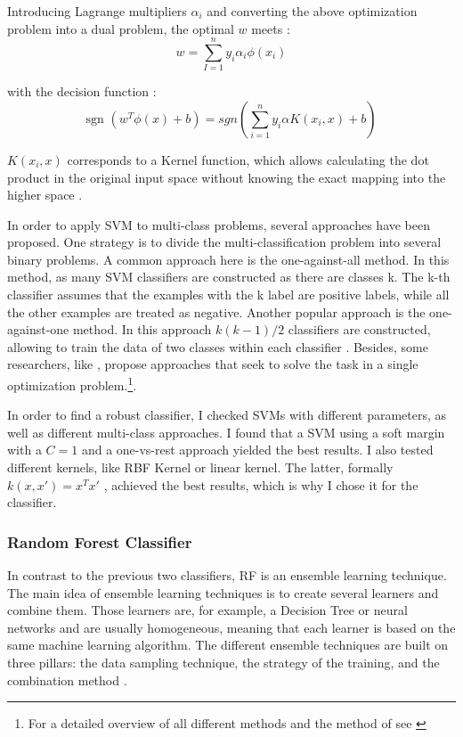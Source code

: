 \documentclass[12pt, a4paper, titlepage]{article}
\begin{document}
Introducing Lagrange multipliers $\alpha_i$ and converting the above optimization problem into a dual problem, the optimal $w$ meets \citep{Chang2001, Jordan2006}:
\[w = \sum_{I=1}^n y_i\alpha_i\phi(x_i)\]

with the decision function \citep{Chang2001}:
\[\text{sgn } (w^T\phi(x)+b) = sgn(\sum_{i=1}^n y_i \alpha K(x_i, x) +b)\]

$K(x_i, x)$ corresponds to a Kernel function, which allows calculating the dot product in the original input space without knowing the exact mapping into the higher space \citep{Han2012, Jordan2006}. 

In order to apply \ac{SVM} to multi-class problems, several approaches have been proposed. One strategy is to divide the multi-classification problem into several binary problems. A common approach here is the one-against-all method. In this method, as many \ac{SVM} classifiers are constructed as there are classes k. The k-th classifier assumes that the examples with the k label are positive labels, while all the other examples are treated as negative. Another popular approach is the one-against-one method. In this approach $k(k-1)/2$ classifiers are constructed, allowing to train the data of two classes within each classifier \citep{Hsu2002}. Besides, some researchers, like \citet{Crammer2001}, propose approaches that seek to solve the task in a single optimization problem.\footnote{For a detailed overview of all different methods and the method of \citet{Crammer2001} see \citet{Hsu2002,Crammer2001}}. 

In order to find a robust classifier, I checked \ac{SVM}s with different parameters, as well as different multi-class approaches. I found that a \ac{SVM} using a soft margin with a $C=1$ and a one-vs-rest approach yielded the best results. I also tested different kernels, like  RBF Kernel or linear kernel. The latter, formally  $k(x, x') = x^Tx'$ \citep{Jordan2006}, achieved the best results, which is why I chose it for the classifier. 

\subsubsection*{Random Forest Classifier}
In contrast to the previous two classifiers, \ac{RF} is an ensemble learning technique. The main idea of ensemble learning techniques is to create several learners and combine them. Those learners are, for example, a Decision Tree or neural networks and are usually homogeneous, meaning that each learner is based on the same machine learning algorithm. The different ensemble techniques are built on three pillars: the data sampling technique, the strategy of the training, and the combination method \citep{polikar2012, zhou2009}. 
\end{document}
